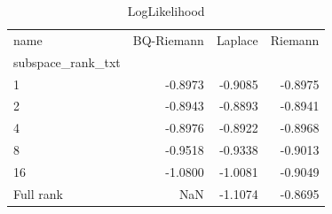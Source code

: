 \begin{table}[H]
\caption{LogLikelihood}
\begin{tabular}{lrrr}
\toprule
name & BQ-Riemann & Laplace & Riemann \\
subspace_rank_txt &  &  &  \\
\midrule
1 & -0.8973 & -0.9085 & -0.8975 \\
2 & -0.8943 & -0.8893 & -0.8941 \\
4 & -0.8976 & -0.8922 & -0.8968 \\
8 & -0.9518 & -0.9338 & -0.9013 \\
16 & -1.0800 & -1.0081 & -0.9049 \\
Full rank & NaN & -1.1074 & -0.8695 \\
\bottomrule
\end{tabular}
\end{table}
